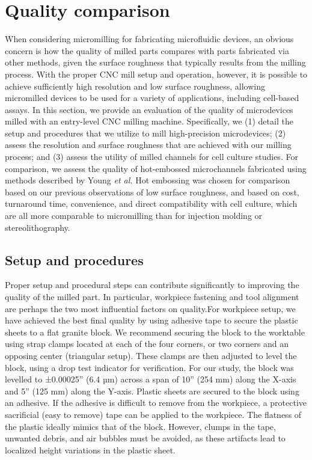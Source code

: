 {\section{Quality comparison}
When considering micromilling for fabricating microfluidic devices, an obvious concern is how the quality of milled parts compares with parts fabricated via other methods, given the surface roughness that typically results from the milling process. With the proper CNC mill setup and operation, however, it is possible to achieve sufficiently high resolution and low surface roughness, allowing micromilled devices to be used for a variety of applications, including cell-based assays.  In this section, we provide an evaluation of the quality of microdevices milled with an entry-level CNC milling machine. Specifically, we (1) detail the setup and procedures that we utilize to mill high-precision microdevices; (2) assess the resolution and surface roughness that are achieved with our milling process; and (3) assess the utility of milled channels for cell culture studies. For comparison, we assess the quality of hot-embossed microchannels fabricated using methods described by Young \textit{et al.} \cite{Young2011} Hot embossing was chosen for comparison based on our previous observations of low surface roughness, and based on cost, turnaround time, convenience, and direct compatibility with cell culture, which are all more comparable to micromilling than for injection molding or stereolithography. 


\subsection{Setup and procedures}
Proper setup and procedural steps can contribute significantly to improving the quality of the milled part. In particular, workpiece fastening and tool alignment are perhaps the two most influential factors on quality.For workpiece setup, we have achieved the best final quality by using adhesive tape to secure the plastic sheets to a flat granite block. We recommend securing the block to the worktable using strap clamps located at each of the four corners, or two corners and an opposing center (triangular setup).  These clamps are then adjusted to level the block, using a drop test indicator for verification. For our study, the block was levelled to ±0.00025” (6.4 µm) across a span of 10” (254 mm) along the X-axis and 5” (125 mm) along the Y-axis. Plastic sheets are secured to the block using an adhesive. If the adhesive is difficult to remove from the workpiece, a protective sacrificial (easy to remove) tape can be applied to the workpiece. The flatness of the plastic ideally mimics that of the block. However, clumps in the tape, unwanted debris, and air bubbles must be avoided, as these artifacts lead to localized height variations in the plastic sheet.


}
